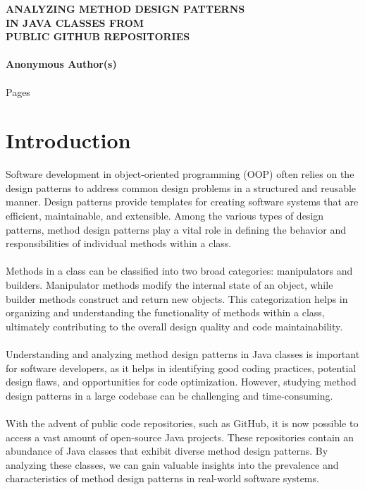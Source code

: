 \documentclass[draft]{article}
\begin{document}
\newpage
\thispagestyle{empty}
\clearpage
{}
\bigskip
\begin{center}
\topskip=0pt
\vspace*{\fill}
\textbf{ANALYZING METHOD DESIGN PATTERNS\\
IN JAVA CLASSES FROM\\
PUBLIC GITHUB REPOSITORIES\\
~\\
Anonymous Author(s)}\\
~\\
Pages \ztotpages\\
\vspace*{\fill}
\end{center}
\newpage
\thispagestyle{empty}
\tableofcontents
\newpage\section{Introduction}
Software development in object-oriented programming (OOP) often relies on the design patterns to address common design problems in a structured and reusable manner. Design patterns provide templates for creating software systems that are efficient, maintainable, and extensible. Among the various types of design patterns, method design patterns play a vital role in defining the behavior and responsibilities of individual methods within a class.\\
~\\
Methods in a class can be classified into two broad categories: manipulators and builders. Manipulator methods modify the internal state of an object, while builder methods construct and return new objects. This categorization helps in organizing and understanding the functionality of methods within a class, ultimately contributing to the overall design quality and code maintainability.\\
~\\
Understanding and analyzing method design patterns in Java classes is important for software developers, as it helps in identifying good coding practices, potential design flaws, and opportunities for code optimization. However, studying method design patterns in a large codebase can be challenging and time-consuming.\\
~\\
With the advent of public code repositories, such as GitHub, it is now possible to access a vast amount of open-source Java projects. These repositories contain an abundance of Java classes that exhibit diverse method design patterns. By analyzing these classes, we can gain valuable insights into the prevalence and characteristics of method design patterns in real-world software systems.\\
\end{document}
